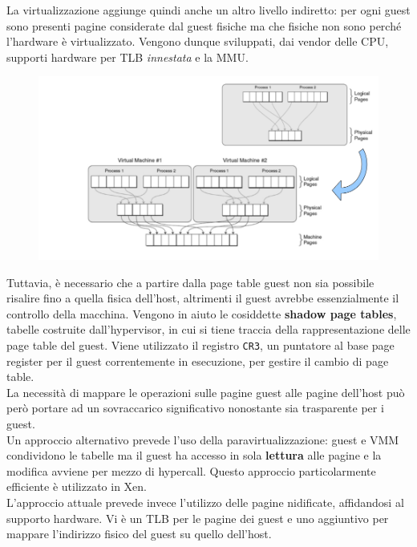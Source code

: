 \documentclass{article}
\begin{document}
		La virtualizzazione aggiunge quindi anche un altro livello indiretto: per ogni guest sono presenti pagine considerate dal guest fisiche ma che fisiche non sono perché l'hardware è virtualizzato. Vengono dunque sviluppati, dai vendor
		delle CPU, supporti hardware per TLB \emph{innestata} e la MMU.
		\begin{figure}[ht]
			\centering
			\includegraphics[width=0.7\linewidth]{images/SAC_B5_nestedtlb}
			\label{fig:sacb5nestedtlb}
		\end{figure}
		
		Tuttavia, è necessario che a partire dalla page table guest non sia possibile risalire fino a quella fisica dell'host, altrimenti il guest avrebbe essenzialmente il controllo della macchina. Vengono in aiuto le cosiddette \textbf{shadow page tables}, tabelle costruite dall'hypervisor, in cui si tiene traccia della rappresentazione delle page table del guest. Viene utilizzato il registro \verb*|CR3|, un puntatore al base page register per il guest correntemente in esecuzione, per gestire il cambio di page table.\\
		La necessità di mappare le operazioni sulle pagine guest alle pagine dell'host può però portare ad un sovraccarico significativo nonostante sia trasparente per i guest.\\ 
		
		Un approccio alternativo prevede l'uso della paravirtualizzazione: guest e VMM condividono le tabelle ma il guest ha accesso in sola \textbf{lettura} alle pagine e la modifica avviene per mezzo di hypercall.
		Questo approccio particolarmente efficiente è utilizzato in Xen.\\
		
		L'approccio attuale prevede invece l'utilizzo delle pagine nidificate, affidandosi al supporto hardware. Vi è un TLB per le pagine dei guest e uno aggiuntivo per mappare l'indirizzo fisico del guest su quello dell'host.
		
\end{document}
